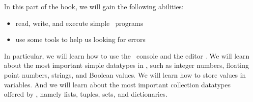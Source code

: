 %
%
In this part of the book, we will gain the following abilities:%
%
\begin{itemize}%
\item read, write, and execute simple \python\ programs%
\item use some tools to help us looking for errors%
\end{itemize}%
%
In particular, we will learn how to use the \python\ console and the editor \pycharm.
We will learn about the most important simple datatypes in \python, such as integer numbers, floating point numbers, strings, and Boolean values.
We will learn how to store values in variables.
And we will learn about the most important collection datatypes offered by \python, namely lists, tuples, sets, and dictionaries.%
%
%
%
%
%
\endhsection%
%
